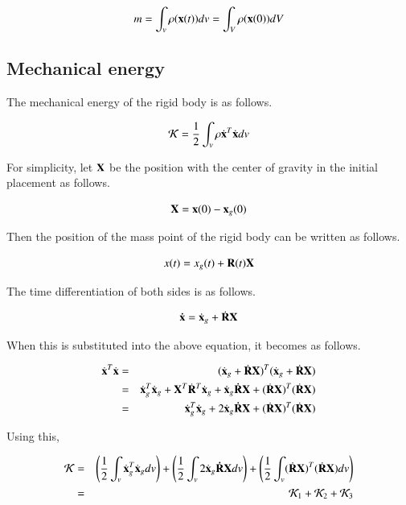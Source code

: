 \begin{equation}
m = \int_v \rho(\mathbf{x}(t)) dv = \int_V \rho(\mathbf{x}(0))dV
\end{equation}


\subsection{Mechanical energy}

The mechanical energy of the rigid body is as follows.

\begin{equation}
{\cal K} = \frac{1}{2}\int_v \rho \dot{\mathbf{x}}^T \dot{\mathbf{x}}dv
\end{equation}

For simplicity, let $\mathbf{X}$ be the position with the center of gravity in the initial placement as follows.

\begin{equation}
\mathbf{X} = \mathbf{x}(0) - \mathbf{x}_g(0)
\end{equation}

Then the position of the mass point of the rigid body can be written as follows.

\begin{equation}
x(t) = x_g(t) + \mathbf{R}(t)\mathbf{X}
\end{equation}

The time differentiation of both sides is as follows.

\begin{equation}
\mathbf{\dot{x}} = \dot{\mathbf{x}}_g + \dot{\mathbf{R}}\mathbf{X}
\end{equation}

When this is substituted into the above equation, it becomes as follows.

\begin{eqnarray}
\dot{\mathbf{x}}^T \dot{\mathbf{x}}
&=& (\dot{\mathbf{x}}_g + \dot{\mathbf{R}}\mathbf{X})^T(\dot{\mathbf{x}}_g + \dot{\mathbf{R}}\mathbf{X}) \\
&=& \dot{\mathbf{x}}^T_g \dot{\mathbf{x}}_g + \mathbf{X}^T\dot{\mathbf{R}}^T\dot{\mathbf{x}}_g + \dot{\mathbf{x}}_g\mathbf{\dot{R}}\mathbf{X} + (\dot{\mathbf{R}}\mathbf{X})^T(\dot{\mathbf{R}}\mathbf{X})\\
&=& \dot{\mathbf{x}}^T_g \dot{\mathbf{x}}_g + 2\dot{\mathbf{x}}_g\mathbf{\dot{R}}\mathbf{X} + (\dot{\mathbf{R}}\mathbf{X})^T(\dot{\mathbf{R}}\mathbf{X})
\end{eqnarray}

Using this,

\begin{eqnarray}
{\cal K}
&=&
\left(\frac{1}{2}\int_v \dot{\mathbf{x}}^T_g \dot{\mathbf{x}}_g dv\right)   +  \left(\frac{1}{2}\int_v 2\dot{\mathbf{x}}_g\mathbf{\dot{R}}\mathbf{X}dv\right)   +   \left(\frac{1}{2}\int_v(\dot{\mathbf{R}}\mathbf{X})^T(\dot{\mathbf{R}}\mathbf{X})dv\right)\\
&=& {\cal K}_1 + {\cal K}_2 + {\cal K}_3
\end{eqnarray}

